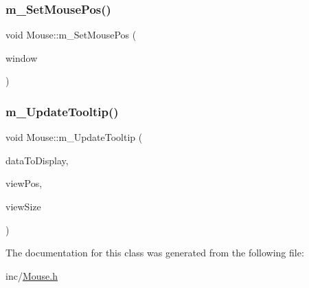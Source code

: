\mbox{\label{class_mouse_a3bd0290c0d6d6d4c5024ad50aac97384}} 
\subsubsection{\texorpdfstring{m\+\_\+\+Set\+Mouse\+Pos()}{m\_SetMousePos()}}
{\footnotesize\ttfamily void Mouse\+::m\+\_\+\+Set\+Mouse\+Pos (\begin{DoxyParamCaption}\item[{sf\+::\+Render\+Window \&}]{window }\end{DoxyParamCaption})}

\mbox{\label{class_mouse_ab3b5422cbcf9eae16684998912f20b52}} 
\subsubsection{\texorpdfstring{m\+\_\+\+Update\+Tooltip()}{m\_UpdateTooltip()}}
{\footnotesize\ttfamily void Mouse\+::m\+\_\+\+Update\+Tooltip (\begin{DoxyParamCaption}\item[{std\+::string}]{data\+To\+Display,  }\item[{sf\+::\+Vector2f}]{view\+Pos,  }\item[{sf\+::\+Vector2f}]{view\+Size }\end{DoxyParamCaption})}



The documentation for this class was generated from the following file\+:\begin{DoxyCompactItemize}
\item 
inc/\mbox{\hyperlink{_mouse_8h}{Mouse.\+h}}\end{DoxyCompactItemize}
